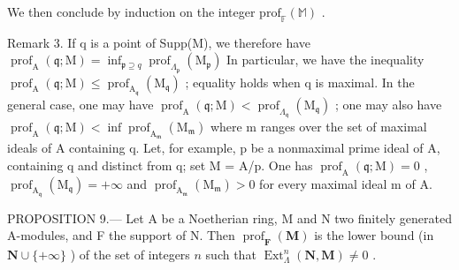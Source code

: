 We then conclude by induction on the integer \(\mathrm{prof}_{\mathbb{F}}(\mathbb{M})\) .

Remark 3. If q is a point of Supp(M), we therefore have \(\operatorname{prof}_{\mathrm{A}}(\mathfrak{q};\mathrm{M}) = \inf_{\mathfrak{p}\supseteq q} \operatorname{prof}_{\Lambda_{\mathfrak{p}}}(\mathrm{M}_{\mathfrak{p}})\) In particular, we have the inequality \(\operatorname{prof}_{\mathrm{A}}(\mathfrak{q};\mathrm{M}) \leqslant \operatorname{prof}_{\mathrm{A}_{\mathfrak{q}}}(\mathrm{M}_{\mathfrak{q}})\) ; equality holds when q is maximal. In the general case, one may have \(\operatorname{prof}_{\mathrm{A}}(\mathfrak{q};\mathrm{M}) < \operatorname{prof}_{\Lambda_{\mathfrak{q}}}(\mathrm{M}_{\mathfrak{q}})\) ; one may also have \(\operatorname{prof}_{\mathrm{A}}(\mathfrak{q};\mathrm{M}) < \inf \operatorname{prof}_{\mathrm{A}_{\mathfrak{m}}}(\mathrm{M}_{\mathfrak{m}})\) where m ranges over the set of maximal ideals of A containing q. Let, for example, p be a nonmaximal prime ideal of A, containing q and distinct from q; set M = A/p. One has \(\operatorname{prof}_{\mathrm{A}}(\mathfrak{q};\mathrm{M}) = 0\) , \(\operatorname{prof}_{\mathrm{A}_{\mathfrak{q}}}(\mathrm{M}_{\mathfrak{q}}) = +\infty\) and \(\operatorname{prof}_{\mathrm{A}_{\mathfrak{m}}}(\mathrm{M}_{\mathfrak{m}}) > 0\) for every maximal ideal m of A.

PROPOSITION 9.--- Let A be a Noetherian ring, M and N two finitely generated A-modules, and F the support of N. Then \(\operatorname{prof}_{\mathbf{F}}(\mathbf{M})\) is the lower bound (in \(\mathbf{N} \cup \{+\infty\}\) ) of the set of integers \(n\) such that \(\operatorname{Ext}_{\Lambda}^{n}(\mathbf{N}, \mathbf{M}) \neq 0\) .


